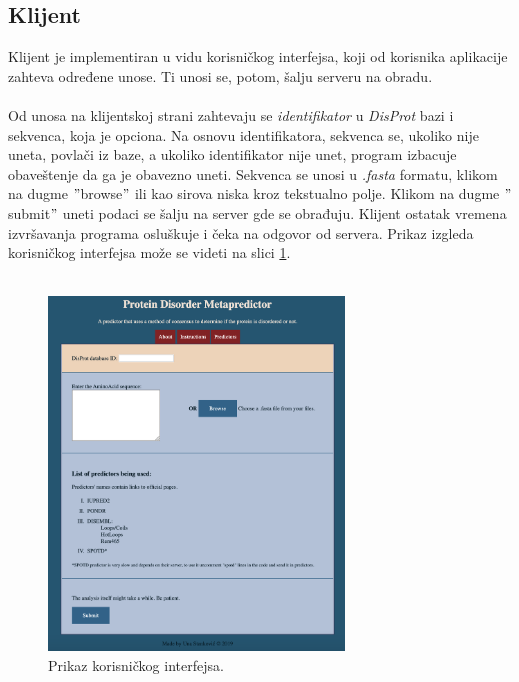 \subsection{Klijent} 
Klijent je implementiran u vidu korisničkog interfejsa, koji od korisnika aplikacije zahteva određene unose. Ti unosi se, potom, šalju serveru na obradu.\\\\
Od unosa na klijentskoj strani zahtevaju se \textit{identifikator} u \textit{DisProt} bazi i sekvenca, koja je opciona. Na osnovu identifikatora, sekvenca se, ukoliko nije uneta, povlači iz baze, a ukoliko identifikator nije unet, program izbacuje obaveštenje da ga je obavezno uneti. Sekvenca se unosi u \textit{.fasta} formatu, klikom na dugme $"$browse$"$ ili kao sirova niska kroz tekstualno polje. Klikom na dugme $"$submit$"$ uneti podaci se šalju na server gde se obrađuju. Klijent ostatak vremena izvršavanja programa osluškuje i čeka na odgovor od servera. Prikaz izgleda korisničkog interfejsa može se videti na slici \ref{fig:interfejs}.\\\\
\begin{figure}[H]
	\centering
    \includegraphics[width=0.7\textwidth]{Figures/App/interfejs.png}
    \caption{Prikaz korisničkog interfejsa.}
    \label{fig:interfejs}
\end{figure}

